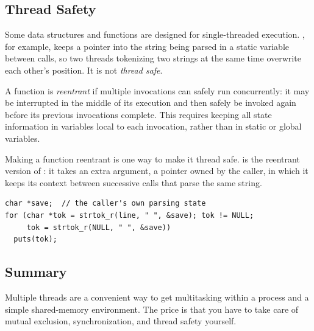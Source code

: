 \subsection{Thread Safety}

Some data structures and functions are designed for single-threaded execution. , for example, keeps a pointer into the string being parsed in a static variable between calls, so two threads tokenizing two strings at the same time overwrite each other's position. It is not \emph{thread safe}.

\begin{definition}
  A function is \emph{reentrant} if multiple invocations can safely run concurrently: it may be interrupted in the middle of its execution and then safely be invoked again before its previous invocations complete. This requires keeping all state information in variables local to each invocation, rather than in static or global variables.
\end{definition}

Making a function reentrant is one way to make it thread safe.  is the reentrant version of : it takes an extra argument, a pointer owned by the caller, in which it keeps its context between successive calls that parse the same string.
\begin{lstlisting}
char *save;  // the caller's own parsing state
for (char *tok = strtok_r(line, " ", &save); tok != NULL;
     tok = strtok_r(NULL, " ", &save))
  puts(tok);
\end{lstlisting}

\subsection{Summary}

\begin{keypoint}[Threads]
  Multiple threads are a convenient way to get multitasking within a process and a simple shared-memory environment. The price is that you have to take care of mutual exclusion, synchronization, and thread safety yourself.
\end{keypoint}
